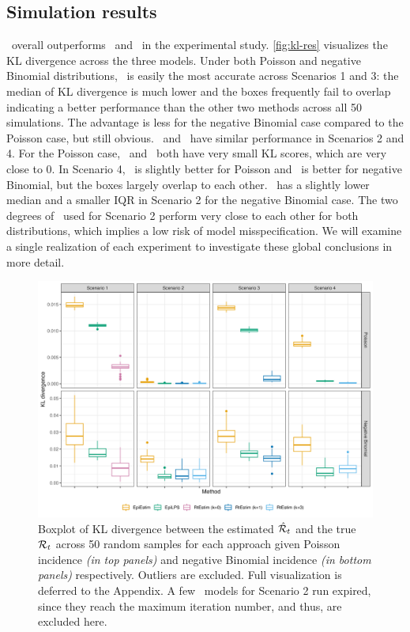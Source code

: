 \subsection{Simulation results}

\RtEstim\ overall outperforms \EpiEstim\ and \EpiLPS\ in the experimental study.
\autoref{fig:kl-res} visualizes the KL divergence across the three models. Under
both Poisson and negative Binomial distributions, \RtEstim\ is easily the most
accurate across Scenarios 1 and 3: the median of KL divergence is much lower
and the boxes frequently fail to overlap indicating a better performance than
the other two methods across all 50 simulations. 
The advantage is less for the
negative Binomial case compared to the Poisson case, but still obvious. 
% 
\RtEstim\ and \EpiLPS\ have similar performance in Scenarios 2 and 4. 
For the Poisson case, \RtEstim\ and \EpiLPS\ both have very small KL scores, which are
very close to 0. In Scenario 4, \RtEstim\ is slightly better for Poisson and \EpiLPS\ 
is better for negative Binomial, but the boxes largely overlap to each other. 
\EpiLPS\ has a slightly lower median and a smaller IQR in Scenario 2 for the negative Binomial case. 
The two degrees of \RtEstim\ used for Scenario 2 perform very close to each other 
for both distributions, which implies a low risk of model misspecification. 
% 
We will examine a single
realization of each experiment to investigate these global conclusions in more
detail.

\begin{figure}[htb]
    \centering
    \includegraphics[width=.99\textwidth]{fig/KL_no_outlier.png}
    \caption{Boxplot of KL divergence between the estimated 
    $\hat{\mathcal{R}}_t$ and the true $\mathcal{R}_t$ across 50 random samples for 
    each approach given Poisson incidence \textit{(in top panels)} and negative 
    Binomial incidence \textit{(in bottom panels)} respectively.  
    Outliers are excluded. Full visualization is deferred to the Appendix. 
    A few \RtEstim\ models for Scenario 2 run expired, since they reach the maximum
    iteration number, and thus, are excluded here.} 
    \label{fig:kl-res}
\end{figure}


